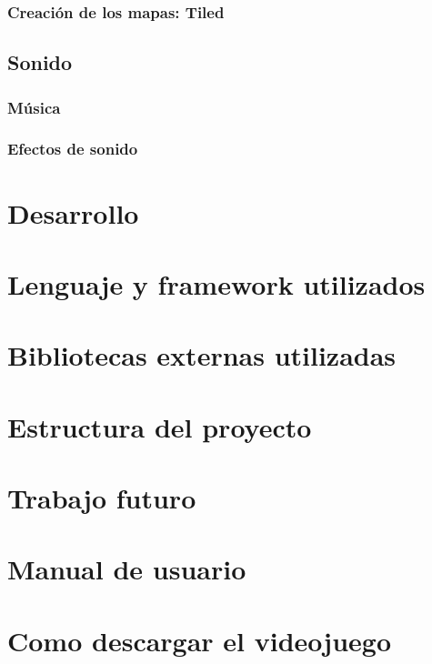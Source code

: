 \documentclass[12pt, spanish]{article}
\begin{document}
\subsubsection{Creación de los mapas: Tiled}

\subsection{Sonido}

\subsubsection{Música}

\subsubsection{Efectos de sonido}

\section*{Desarrollo}
\label{sec:desarrollo}

\section{Lenguaje y framework utilizados}

\section{Bibliotecas externas utilizadas}

\section{Estructura del proyecto}


\section*{Trabajo futuro}
\label{sec:futuro}


\section*{Manual de usuario}
\label{sec:manual}

\section{Como descargar el videojuego}
\end{document}
